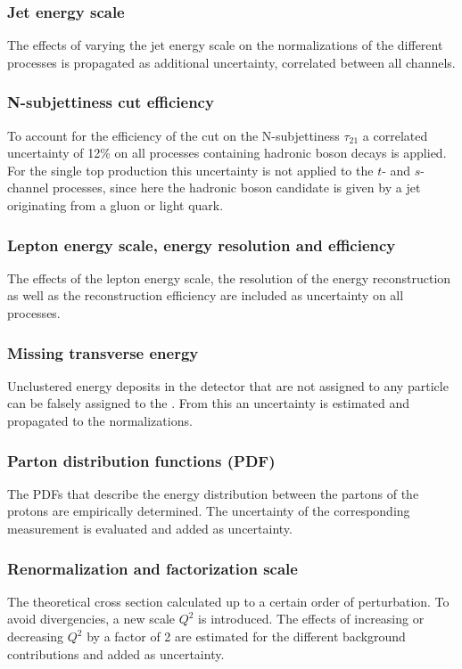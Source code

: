 \subsubsection*{Jet energy scale}
The effects of varying the jet energy scale on the normalizations of the different processes is propagated as additional uncertainty, correlated between all channels.
\subsubsection*{N-subjettiness cut efficiency}
To account for the efficiency of the cut on the N-subjettiness $\tau_{21}$ a correlated uncertainty of 12\% on all processes containing hadronic boson decays is applied. For the single top production this uncertainty is not applied to the $t$- and $s$-channel processes, since here the hadronic boson candidate is given by a jet originating from a gluon or light quark.
\subsubsection*{Lepton energy scale, energy resolution and efficiency}
The effects of the lepton energy scale, the resolution of the energy reconstruction as well as the reconstruction efficiency are included as uncertainty on all processes.
\subsubsection*{Missing transverse energy}
Unclustered energy deposits in the detector that are not assigned to any particle can be falsely assigned to the \MET . From this an uncertainty is estimated and propagated to the normalizations. 
\subsubsection*{Parton distribution functions (PDF)}
The PDFs that describe the energy distribution between the partons of the protons are empirically determined. The uncertainty of the corresponding measurement is evaluated and added as uncertainty.
\subsubsection*{Renormalization and factorization scale}
The theoretical cross section calculated up to a certain order of perturbation. To avoid divergencies, a new scale $Q^2$ is introduced. The effects of increasing or decreasing $Q^2$ by a factor of 2 are estimated for the different background contributions and added as uncertainty. 

